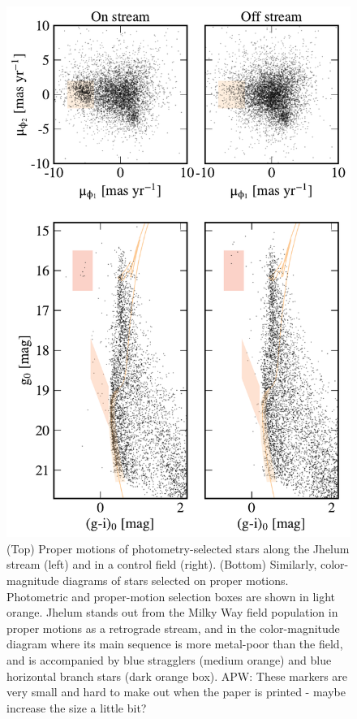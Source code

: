 \documentclass[twocolumn]{aastex62}
\newcommand{\apw}[1]{{\color{blue} APW: #1}}
\begin{document}
\begin{figure}
\begin{center}
\includegraphics[width=0.95\columnwidth]{selection.pdf}
\end{center}
\caption{
(Top) Proper motions of photometry-selected stars along the Jhelum stream (left) and in a control field (right).
(Bottom) Similarly, color-magnitude diagrams of stars selected on proper motions.
Photometric and proper-motion selection boxes are shown in light orange.
Jhelum stands out from the Milky Way field population in proper motions as a retrograde stream, and in the color-magnitude diagram where its main sequence is more metal-poor than the field, and is accompanied by blue stragglers (medium orange) and blue horizontal branch stars (dark orange box).
\apw{These markers are very small and hard to make out when the paper is printed - maybe increase the size a little bit?}
}
\label{fig:properties}
\end{figure}
\end{document}
